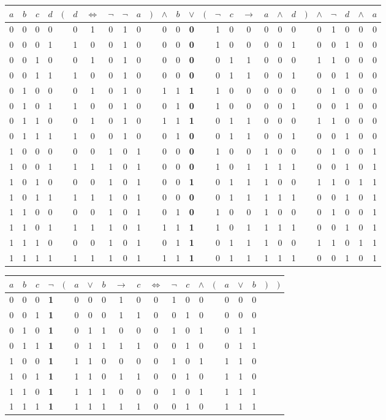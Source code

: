 \documentclass[11pt, landscape]{article}
\newcommand{\AND}{{\wedge}}
\newcommand{\OR}{{\vee}}
\newcommand{\IMP}{{\rightarrow}}
\newcommand{\AEQ}{{\Leftrightarrow}}
\begin{document}
\vspace{1cm}

\begin{tabular}{|c|c|c|c|ccccccccccccccccccccccc|} \hline
$a$&$b$&$c$&$d$&$($&$d$&$\AEQ$&$\neg$&$\neg$&$a$&$)$&$\AND$&$b$&$\OR$&$($&$\neg$&$c$&$\IMP$&$a$&$\AND$&$d$&$)$&$\AND$&$\neg$&$d$&$\AND$&$a$\\\hline
0&0&0&0&&0&1&0&1&0&&0&0&\textbf{0}&&1&0&0&0&0&0&&0&1&0&0&0\\\hline
0&0&0&1&&1&0&0&1&0&&0&0&\textbf{0}&&1&0&0&0&0&1&&0&0&1&0&0\\\hline
0&0&1&0&&0&1&0&1&0&&0&0&\textbf{0}&&0&1&1&0&0&0&&1&1&0&0&0\\\hline
0&0&1&1&&1&0&0&1&0&&0&0&\textbf{0}&&0&1&1&0&0&1&&0&0&1&0&0\\\hline
0&1&0&0&&0&1&0&1&0&&1&1&\textbf{1}&&1&0&0&0&0&0&&0&1&0&0&0\\\hline
0&1&0&1&&1&0&0&1&0&&0&1&\textbf{0}&&1&0&0&0&0&1&&0&0&1&0&0\\\hline
0&1&1&0&&0&1&0&1&0&&1&1&\textbf{1}&&0&1&1&0&0&0&&1&1&0&0&0\\\hline
0&1&1&1&&1&0&0&1&0&&0&1&\textbf{0}&&0&1&1&0&0&1&&0&0&1&0&0\\\hline
1&0&0&0&&0&0&1&0&1&&0&0&\textbf{0}&&1&0&0&1&0&0&&0&1&0&0&1\\\hline
1&0&0&1&&1&1&1&0&1&&0&0&\textbf{0}&&1&0&1&1&1&1&&0&0&1&0&1\\\hline
1&0&1&0&&0&0&1&0&1&&0&0&\textbf{1}&&0&1&1&1&0&0&&1&1&0&1&1\\\hline
1&0&1&1&&1&1&1&0&1&&0&0&\textbf{0}&&0&1&1&1&1&1&&0&0&1&0&1\\\hline
1&1&0&0&&0&0&1&0&1&&0&1&\textbf{0}&&1&0&0&1&0&0&&0&1&0&0&1\\\hline
1&1&0&1&&1&1&1&0&1&&1&1&\textbf{1}&&1&0&1&1&1&1&&0&0&1&0&1\\\hline
1&1&1&0&&0&0&1&0&1&&0&1&\textbf{1}&&0&1&1&1&0&0&&1&1&0&1&1\\\hline
1&1&1&1&&1&1&1&0&1&&1&1&\textbf{1}&&0&1&1&1&1&1&&0&0&1&0&1\\\hline
\end{tabular}

\vspace{1cm}

\begin{tabular}{|c|c|c|ccccccccccccccccc|} \hline
$a$&$b$&$c$&$\neg$&$($&$a$&$\OR$&$b$&$\IMP$&$c$&$\AEQ$&$\neg$&$c$&$\AND$&$($&$a$&$\OR$&$b$&$)$&$)$\\\hline
0&0&0&\textbf{1}&&0&0&0&1&0&0&1&0&0&&0&0&0&&\\\hline
0&0&1&\textbf{1}&&0&0&0&1&1&0&0&1&0&&0&0&0&&\\\hline
0&1&0&\textbf{1}&&0&1&1&0&0&0&1&0&1&&0&1&1&&\\\hline
0&1&1&\textbf{1}&&0&1&1&1&1&0&0&1&0&&0&1&1&&\\\hline
1&0&0&\textbf{1}&&1&1&0&0&0&0&1&0&1&&1&1&0&&\\\hline
1&0&1&\textbf{1}&&1&1&0&1&1&0&0&1&0&&1&1&0&&\\\hline
1&1&0&\textbf{1}&&1&1&1&0&0&0&1&0&1&&1&1&1&&\\\hline
1&1&1&\textbf{1}&&1&1&1&1&1&0&0&1&0&&1&1&1&&\\\hline
\end{tabular}
\end{document}
